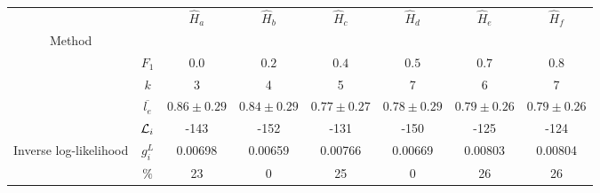 \begin{tabular}{|cc|c|c|c|c|c|c|}
\hline
          &      &                              $\hat{H}_a$ &                              $\hat{H}_b$ &                              $\hat{H}_c$ &                              $\hat{H}_d$ &                              $\hat{H}_e$ &                              $\hat{H}_f$ \\
Method &  &                                          &                                          &                                          &                                          &                                          &                                          \\

          & $F_1$ &                                    $0.0$ &                                    $0.2$ &                                    $0.4$ &                                    $0.5$ &                                    $0.7$ &                                    $0.8$ \\
          & $k$ &                                        3 &                                        4 &                                        5 &                                        7 &                                        6 &                                        7 \\
          & $\overline{l_e}$ &                          $0.86 \pm 0.29$ &                          $0.84 \pm 0.29$ &                          $0.77 \pm 0.27$ &                          $0.78 \pm 0.29$ &                          $0.79 \pm 0.26$ &                          $0.79 \pm 0.26$ \\
          & ${\mathcal{L}}_i$ &                                     -143 &                                     -152 &                                     -131 &                                     -150 &                                     -125 &                                     -124 \\
\hline \multirow{2}{*}{Inverse log-likelihood } & $g_i^L$ &                                  0.00698 &                                  0.00659 &                                  0.00766 &                                  0.00669 &                                  0.00803 &                                  0.00804 \\
          & $\%$ &                                       23 &                                        0 &                                       25 &                                        0 &                                       26 &                                       26 \\

\end{tabular}
